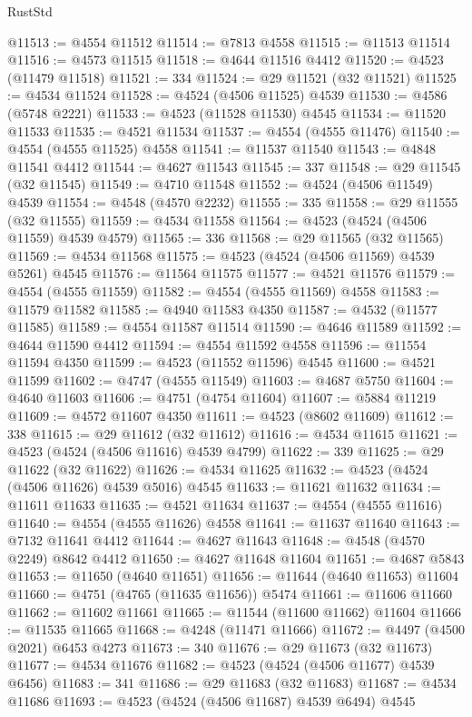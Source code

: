 \begin{lexlean}{RustStd}
\begin{coremodule}
@11513 := @4554 @11512
@11514 := @7813 @4558
@11515 := @11513 @11514
@11516 := @4573 @11515
@11518 := @4644 @11516 @4412
@11520 := @4523 (@11479 @11518)
@11521 := 334
@11524 := @29 @11521 (@32 @11521)
@11525 := @4534 @11524
@11528 := @4524 (@4506 @11525) @4539
@11530 := @4586 (@5748 @2221)
@11533 := @4523 (@11528 @11530) @4545
@11534 := @11520 @11533
@11535 := @4521 @11534
@11537 := @4554 (@4555 @11476)
@11540 := @4554 (@4555 @11525) @4558
@11541 := @11537 @11540
@11543 := @4848 @11541 @4412
@11544 := @4627 @11543
@11545 := 337
@11548 := @29 @11545 (@32 @11545)
@11549 := @4710 @11548
@11552 := @4524 (@4506 @11549) @4539
@11554 := @4548 (@4570 @2232)
@11555 := 335
@11558 := @29 @11555 (@32 @11555)
@11559 := @4534 @11558
@11564 := @4523 (@4524 (@4506 @11559) @4539 @4579)
@11565 := 336
@11568 := @29 @11565 (@32 @11565)
@11569 := @4534 @11568
@11575 := @4523 (@4524 (@4506 @11569) @4539 @5261) @4545
@11576 := @11564 @11575
@11577 := @4521 @11576
@11579 := @4554 (@4555 @11559)
@11582 := @4554 (@4555 @11569) @4558
@11583 := @11579 @11582
@11585 := @4940 @11583 @4350
@11587 := @4532 (@11577 @11585)
@11589 := @4554 @11587 @11514
@11590 := @4646 @11589
@11592 := @4644 @11590 @4412
@11594 := @4554 @11592 @4558
@11596 := @11554 @11594 @4350
@11599 := @4523 (@11552 @11596) @4545
@11600 := @4521 @11599
@11602 := @4747 (@4555 @11549)
@11603 := @4687 @5750
@11604 := @4640 @11603
@11606 := @4751 (@4754 @11604)
@11607 := @5884 @11219
@11609 := @4572 @11607 @4350
@11611 := @4523 (@8602 @11609)
@11612 := 338
@11615 := @29 @11612 (@32 @11612)
@11616 := @4534 @11615
@11621 := @4523 (@4524 (@4506 @11616) @4539 @4799)
@11622 := 339
@11625 := @29 @11622 (@32 @11622)
@11626 := @4534 @11625
@11632 := @4523 (@4524 (@4506 @11626) @4539 @5016) @4545
@11633 := @11621 @11632
@11634 := @11611 @11633
@11635 := @4521 @11634
@11637 := @4554 (@4555 @11616)
@11640 := @4554 (@4555 @11626) @4558
@11641 := @11637 @11640
@11643 := @7132 @11641 @4412
@11644 := @4627 @11643
@11648 := @4548 (@4570 @2249) @8642 @4412
@11650 := @4627 @11648 @11604
@11651 := @4687 @5843
@11653 := @11650 (@4640 @11651)
@11656 := @11644 (@4640 @11653) @11604
@11660 := @4751 (@4765 (@11635 @11656)) @5474
@11661 := @11606 @11660
@11662 := @11602 @11661
@11665 := @11544 (@11600 @11662) @11604
@11666 := @11535 @11665
@11668 := @4248 (@11471 @11666)
@11672 := @4497 (@4500 @2021) @6453 @4273
@11673 := 340
@11676 := @29 @11673 (@32 @11673)
@11677 := @4534 @11676
@11682 := @4523 (@4524 (@4506 @11677) @4539 @6456)
@11683 := 341
@11686 := @29 @11683 (@32 @11683)
@11687 := @4534 @11686
@11693 := @4523 (@4524 (@4506 @11687) @4539 @6494) @4545

\end{coremodule}
\end{lexlean}
